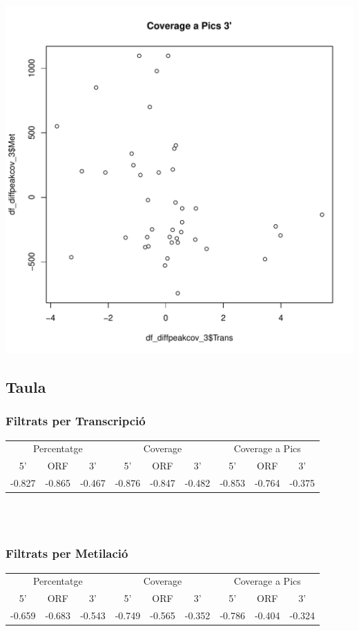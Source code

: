 \documentclass{article}\usepackage[]{graphicx}\usepackage[]{color}
\makeatletter
\def\maxwidth{ %
  \ifdim\Gin@nat@width>\linewidth
    \linewidth
  \else
    \Gin@nat@width
  \fi
}
\newenvironment{knitrout}{}{} %
\makeatother
\begin{document}
\begin{knitrout}
{\includegraphics[width=\maxwidth]{figure/minimal-correlacions_met-9} 

}



\end{knitrout}
\clearpage

\subsection{Taula}
\subsubsection{Filtrats per Transcripció}
\begin{tabular}{ccc|ccc|ccc}
\hline
\multicolumn{3}{c}{Percentatge} &
\multicolumn{3}{c}{Coverage} &
\multicolumn{3}{c}{Coverage a Pics} \\
\cline{1-3}
\cline{4-6}
\cline{7-9}
5' & ORF & 3' & 5' & ORF & 3' & 5' & ORF & 3' \\
\hline
-0.827 & -0.865 & -0.467 & 
-0.876 & -0.847 & -0.482 & 
-0.853 & -0.764 & -0.375\\
\hline
\end{tabular} \\\\

\subsubsection{Filtrats per Metilació}
\begin{tabular}{ccc|ccc|ccc}
\hline
\multicolumn{3}{c}{Percentatge} &
\multicolumn{3}{c}{Coverage} &
\multicolumn{3}{c}{Coverage a Pics} \\
\cline{1-3}
\cline{4-6}
\cline{7-9}
5' & ORF & 3' & 5' & ORF & 3' & 5' & ORF & 3' \\
\hline
-0.659 & -0.683 & -0.543 & 
-0.749 & -0.565 & -0.352 & 
-0.786 & -0.404 & -0.324\\
\hline
\end{tabular} \\\\
\end{document}

